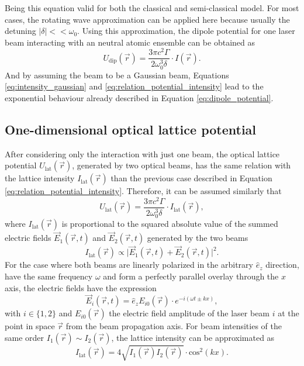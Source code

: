 Being this equation valid for both the classical and semi-classical model. For most cases, the rotating wave approximation can be applied here because usually the detuning $\mathopen|\delta\mathclose| << \omega_0$. Using this approximation, the dipole potential for one laser beam interacting with an neutral atomic ensemble can be obtained as
\begin{equation}\label{eq:relation_potential_intensity}
	U_{\text{dip}}(\vec{r}) = \frac{3\pi c^2 \Gamma}{2\omega_0^3 \delta} \cdot I(\vec{r}).
\end{equation} 
And by assuming the beam to be a Gaussian beam, Equations \eqref{eq:intensity_gaussian} and \eqref{eq:relation_potential_intensity} lead to the exponential behaviour already described in Equation \eqref{eq:dipole_potential}.

\subsection{One-dimensional optical lattice potential}\label{subsec:One_dim_optical_lattice}

After considering only the interaction with just one beam, the optical lattice potential $U_\text{lat}(\vec{r})$, generated by two optical beams, has the same relation with the lattice intensity $I_\text{lat}(\vec{r})$ than the previous case described in Equation \eqref{eq:relation_potential_intensity}. Therefore, it can be assumed similarly that
\begin{equation}\label{eq:relation_lattice_potential_intensity}
	U_{\text{lat}}(\vec{r}) = \frac{3\pi c^2 \Gamma}{2\omega_0^3 \delta} \cdot I_{\text{lat}}(\vec{r}),
\end{equation} 
where $I_\text{lat}(\vec{r})$ is proportional to the squared absolute value of the summed electric fields $\vec{E}_1(\vec{r}, t)$ and $\vec{E}_2(\vec{r}, t)$ generated by the two beams
\begin{equation}\label{eq:relation_lattice_inesity_fields}
	I_{\text{lat}}(\vec{r}) \propto \mathopen\big|\vec{E}_1(\vec{r}, t)+\vec{E}_2(\vec{r}, t)\mathclose\big|^2.
\end{equation}
For the case where both beams are linearly polarized in the arbitrary $\hat{e}_z$ direction, have the same frequency $\omega$ and form a perfectly parallel overlay through the $x$ axis, the electric fields have the expression
\begin{equation}\label{eq:relation_electric_fields}
	\vec{E}_{i}(\vec{r}, t) = \hat{e}_z E_{i0}(\vec{r})\cdot e^{-i(\omega t \pm kx)},
\end{equation}
with $i\in \{1,2\}$ and $E_{i0}(\vec{r})$ the electric field amplitude of the laser beam $i$ at the point in space $\vec{r}$ from the beam propagation axis. For beam intensities of the same order $I_{1}(\vec{r}) \sim I_{2}(\vec{r})$, the lattice intensity can be approximated as
\begin{equation}\label{eq:relation_lattice_inesity}
	I_{\text{lat}}(\vec{r}) = 4\sqrt{I_{1}(\vec{r})I_{2}(\vec{r})} \cdot \text{cos}^2(kx).
\end{equation}

